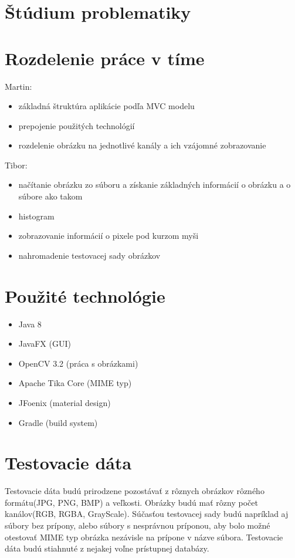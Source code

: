 \documentclass[12pt,a4paper,titlepage,final]{article}
\begin{document}
\section{Štúdium problematiky}
\ifdefined\whos

\fi


\section{Rozdelenie práce v tíme}
Martin:
\begin{itemize}
	\item základná štruktúra aplikácie podľa MVC modelu
	\item prepojenie použitých technológií
	\item rozdelenie obrázku na jednotlivé kanály a ich vzájomné zobrazovanie
\end{itemize}
Tibor:
\begin{itemize}
	\item načítanie obrázku zo súboru a získanie základných informácií o obrázku a o súbore ako takom
	\item histogram
	\item zobrazovanie informácií o pixele pod kurzom myši
	\item nahromadenie testovacej sady obrázkov
\end{itemize}

\section{Použité technológie}
\begin{itemize}
	\item Java 8
	\item JavaFX (GUI)
	\item OpenCV 3.2 (práca s obrázkami)
	\item Apache Tika Core (MIME typ)
	\item JFoenix (material design)
	\item Gradle (build system)
\end{itemize}

\section{Testovacie dáta}
Testovacie dáta budú prirodzene pozostávať z rôznych obrázkov rôzného formátu(JPG, PNG, BMP) a veľkosti. Obrázky budú mať rôzny počet kanálov(RGB, RGBA, GrayScale). Súčasťou testovacej sady budú napríklad aj súbory bez prípony, alebo súbory s nesprávnou príponou, aby bolo možné otestovať MIME typ obrázka nezávisle na prípone v názve súbora.
Testovacie dáta budú stiahnuté z nejakej voľne prístupnej databázy.
\end{document}
